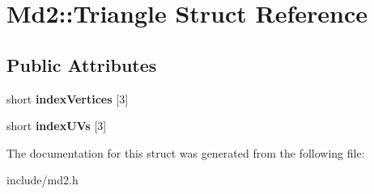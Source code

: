 \hypertarget{structMd2_1_1Triangle}{\section{Md2\-:\-:Triangle Struct Reference}
\label{structMd2_1_1Triangle}
}
\subsection*{Public Attributes}
\begin{DoxyCompactItemize}
\item 
\hypertarget{structMd2_1_1Triangle_af5a5aea0ae06e203fd77ba1d0ce9ca54}{short {\bfseries index\-Vertices} \mbox{[}3\mbox{]}}\label{structMd2_1_1Triangle_af5a5aea0ae06e203fd77ba1d0ce9ca54}

\item 
\hypertarget{structMd2_1_1Triangle_a28f12fb49dab65f01ddb4de9d9abcdca}{short {\bfseries index\-U\-Vs} \mbox{[}3\mbox{]}}\label{structMd2_1_1Triangle_a28f12fb49dab65f01ddb4de9d9abcdca}

\end{DoxyCompactItemize}


The documentation for this struct was generated from the following file\-:\begin{DoxyCompactItemize}
\item 
include/md2.\-h\end{DoxyCompactItemize}
